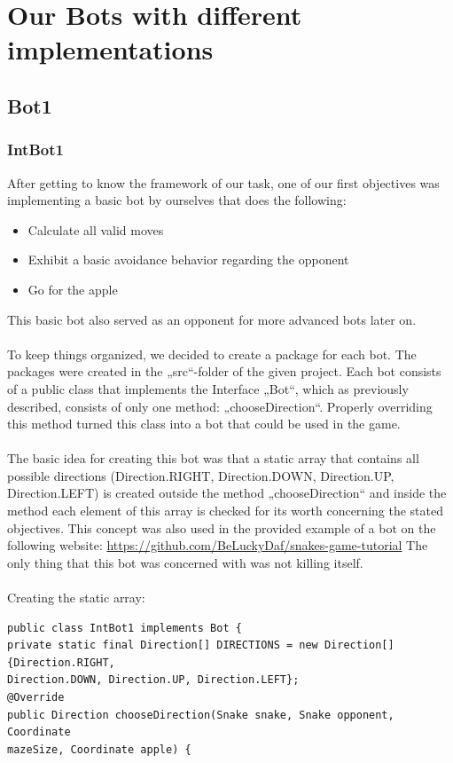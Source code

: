 \documentclass[a4paper,12pt]{article}
\begin{document}
\section{Our Bots with different implementations}
\subsection{Bot1}
\subsubsection{IntBot1}
After getting to know the framework of our task, one of our first objectives was implementing a
basic bot by ourselves that does the following:\\
\begin{itemize}
\item Calculate all valid moves
\item Exhibit a basic avoidance behavior regarding the opponent
\item Go for the apple
\end{itemize}
This basic bot also served as an opponent for more advanced bots later on.\\
\\
To keep things organized, we decided to create a package for each bot. The packages were created
in the „src“-folder of the given project. Each bot consists of a public class that implements the
Interface „Bot“, which as previously described, consists of only one method: „chooseDirection“.
Properly overriding this method turned this class into a bot that could be used in the game.
\\
\\
The basic idea for creating this bot was that a static array that contains all possible directions
(Direction.RIGHT, Direction.DOWN, Direction.UP, Direction.LEFT) is created outside the method
„chooseDirection“ and inside the method each element of this array is checked for its worth
concerning the stated objectives. This concept was also used in the provided example of  a bot  on the following website: \url{https://github.com/BeLuckyDaf/snakes-game-tutorial} The only thing that this bot was concerned with was not killing itself.\\
\\
Creating the static array:
\begin{verbatim}
public class IntBot1 implements Bot {
private static final Direction[] DIRECTIONS = new Direction[]{Direction.RIGHT,
Direction.DOWN, Direction.UP, Direction.LEFT};
@Override
public Direction chooseDirection(Snake snake, Snake opponent, Coordinate
mazeSize, Coordinate apple) {
\end{verbatim}
\end{document}
